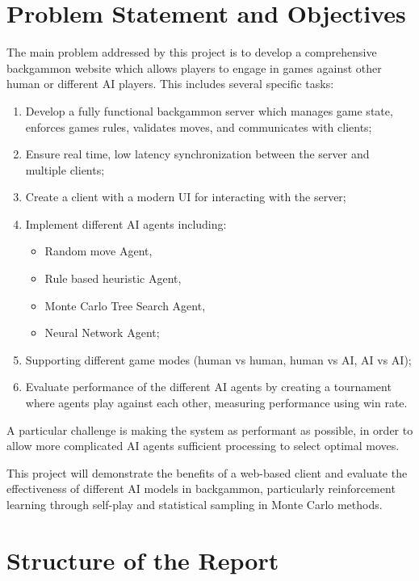 \section{Problem Statement and Objectives}
The main problem addressed by this project is to develop a comprehensive backgammon website which allows players to engage in games against other human or different AI players. This includes several specific tasks:
\begin{enumerate}
    \item Develop a fully functional backgammon server which manages game state, enforces games rules, validates moves, and communicates with clients;
    \item Ensure real time, low latency synchronization between the server and multiple clients;
    \item Create a client with a modern UI for interacting with the server;
    \item Implement different AI agents including:
    \begin{itemize}
        \item Random move Agent,
        \item Rule based heuristic Agent,
        \item Monte Carlo Tree Search Agent,
        \item Neural Network Agent;
    \end{itemize}
    \item Supporting different game modes (human vs human, human vs AI, AI vs AI);
    \item Evaluate performance of the different AI agents by creating a tournament where agents play against each other, measuring performance using win rate.
\end{enumerate}

A particular challenge is making the system as performant as possible, in order to allow more complicated AI agents sufficient processing to select optimal moves.

This project will demonstrate the benefits of a web-based client and evaluate the effectiveness of different AI models in backgammon, particularly reinforcement learning through self-play and statistical sampling in Monte Carlo methods.

\section{Structure of the Report}




